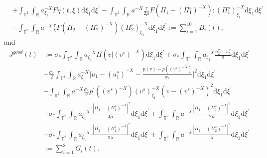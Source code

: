 \documentclass[10pt,a4paper]{amsart}
\newcommand{\dif}{\mathrm{d}}
\begin{document}
\begin{lemma}
\begin{align*}
&+\int_{\mathbb{T}^2}\int_{\mathbb{R}}a^{-X}_{\xi_1}F\eta(t,\xi)\dif \xi_1\dif \xi^{\prime}
-\int_{\mathbb{T}^2}\int_{\mathbb{R}}a^{-X}\frac{\tau}{2\mu}F\left(\Pi_1-(\Pi_1^s)^{-X}\right) : (\Pi_1^s)^{-X}_{\xi_1}\dif \xi_1\dif \xi^{\prime}\\
&-\int_{\mathbb{T}^2}\int_{\mathbb{R}}a^{-X}\frac{\tau}{\lambda}F\left(\Pi_2-(\Pi_2^s)^{-X}\right)
(\Pi_2^s)^{-X}_{\xi_1}\dif \xi_1\dif \xi^{\prime}
:=\sum\limits_{i=1}^{10}B_i(t),
\end{align*}
and
\begin{align*}
J^{good}(t)&:=\sigma_\ast\int_{\mathbb{T}^2}\int_{\mathbb{R}}a^{-X}_{\xi_1} H(v|(v^s)^{-X})\dif \xi_1\dif \xi^{\prime}
+\sigma_\ast\int_{\mathbb{T}^2}\int_{\mathbb{R}}a^{-X}_{\xi_1} \frac{u_2^2+u_3^2}{2}\dif \xi_1\dif \xi^{\prime}\\
&+\frac{\sigma_\ast}{2}\int_{\mathbb{T}^2}\int_{\mathbb{R}}a^{-X}_{\xi_1}
\Big|u_1-(u_1^s)^{-X}-\frac{p(v)-p((v^s)^{-X})}{\sigma_\ast}\Big|^2\dif \xi_1\dif \xi^{\prime}\\
&-\int_{\mathbb{T}^2}\int_{\mathbb{R}}a^{-X}\frac{\sigma_\ast}{v}p^{\prime}((v^s)^{-X})(v^s)^{-X}_{\xi_1}(v-(v^s)^{-X})^2\dif \xi_1\dif \xi^{\prime}\\
&+\sigma_\ast\int_{\mathbb{T}^2}\int_{\mathbb{R}}a^{-X}_{\xi_1} \frac{\tau|\Pi_1-(\Pi_1^s)^{-X}|^2}{4\mu}\dif \xi_1\dif \xi^{\prime}
+\int_{\mathbb{T}^2}\int_{\mathbb{R}}a^{-X}\frac{|\Pi_1-(\Pi_1^s)^{-X}|^2}{2\mu}\dif \xi_1\dif \xi^{\prime}\\
&+\sigma_\ast\int_{\mathbb{T}^2}\int_{\mathbb{R}}a^{-X}_{\xi_1} \frac{\tau|\Pi_2-(\Pi_2^s)^{-X}|^2}{2\lambda}\dif \xi_1\dif \xi^{\prime}
+\int_{\mathbb{T}^2}\int_{\mathbb{R}}a^{-X}\frac{|\Pi_2-(\Pi_2^s)^{-X}|^2}{\lambda}\dif \xi_1\dif \xi^{\prime}\\
&:=\sum\limits_{i=1}^{8}G_i(t).
\end{align*}
\end{lemma}
\end{document}
